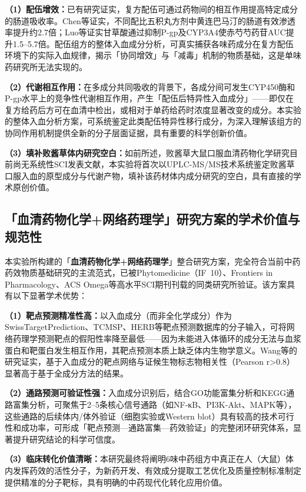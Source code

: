 \documentclass[12pt,a4paper,UTF8,scheme=chinese]{ctexart}
\newcommand{\keyterm}[1]{\textbf{#1}}
\begin{document}
\textbf{（1）配伍增效：}已有研究证实，复方配伍可通过药物间的相互作用提高特定成分的肠道吸收率。Chen等\cite{ChenY2015}证实，不同配比五积丸方剂中黄连巴马汀的肠道有效渗透率提升约2.7倍；Luo等\cite{QiuLab2019}证实甘草酸通过抑制P-gp及CYP3A4使赤芍芍药苷AUC提升1.5--5.7倍。配伍组方的整体入血成分分析，可真实捕获各味药成分在复方配伍环境下的实际入血规律，揭示「协同增效」与「减毒」机制的物质基础，这是单味药研究所无法实现的。

\textbf{（2）代谢相互作用：}在多成分共同吸收的背景下，各成分间可发生CYP450酶和P-gp水平上的竞争性代谢相互作用，产生「配伍后特异性入血成分」——即仅在复方给药后方可在血清中检出，或相对于单药给药时浓度显著改变的成分。本实验的整体入血分析方案，可系统鉴定此类配伍特异性移行成分，为深入理解该组方的协同作用机制提供全新的分子层面证据，具有重要的科学创新价值。

\textbf{（3）填补败酱草体内研究空白：}如前所述，败酱草大鼠口服血清药物化学研究目前尚无系统性SCI发表文献，本实验将首次以UPLC-MS/MS技术系统鉴定败酱草口服入血的原型成分与代谢产物，填补该药材体内成分研究的空白，具有直接的学术原创价值。

\subsection{「血清药物化学+网络药理学」研究方案的学术价值与规范性}

本实验所构建的「\keyterm{血清药物化学+网络药理学}」整合研究方案，完全符合当前中药药效物质基础研究的主流范式，已被Phytomedicine（IF~10）、Frontiers in Pharmacology、ACS Omega等高水平SCI期刊刊载的同类研究所验证\cite{LiuY2023,Feng2021NP,LiuY2024}。该方案具有以下显著学术优势：

\textbf{（1）靶点预测精准性高：}以入血成分（而非全化学成分）作为SwissTargetPrediction、TCMSP、HERB等靶点预测数据库的分子输入，可将网络药理学预测靶点的假阳性率降至最低——因为未能进入体循环的成分无法与血浆蛋白和靶蛋白发生相互作用，其靶点预测本质上缺乏体内生物学意义。Wang等\cite{Wang2020}的研究证实，基于入血成分的靶点网络与证候生物标志物相关性（Pearson r>0.8）显著高于基于全成分方法的结果。

\textbf{（2）通路预测可验证性强：}入血成分识别后，结合GO功能富集分析和KEGG通路富集分析，可聚焦于2--5条核心信号通路（如NF-κB、PI3K-Akt、MAPK等），这些通路的后续体内/体外验证（细胞实验或Western blot）具有较高的技术可行性和成功率，可形成「靶点预测—通路富集—药效验证」的完整闭环研究体系，显著提升研究结论的科学可信度。

\textbf{（3）临床转化价值清晰：}本研究最终将阐明6味中药组方中真正在人（大鼠）体内发挥药效的活性分子，为新药开发、有效成分提取工艺优化及质量控制标准制定提供精准的分子靶标，具有明确的中药现代化转化应用价值。
\end{document}
